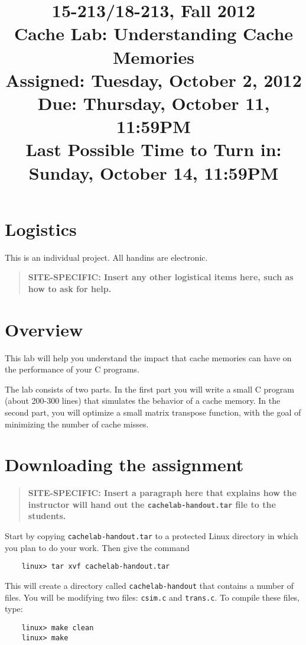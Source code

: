 \documentclass[11pt]{article}
\begin{document}
\title{15-213/18-213, Fall 2012\\
Cache Lab: Understanding Cache Memories\\
Assigned: Tuesday, October 2, 2012\\ 
Due: Thursday, October 11, 11:59PM\\
Last Possible Time to Turn in: Sunday, October 14, 11:59PM
}

\author{}
\date{}

\maketitle

\section{Logistics}
This is an individual project. All handins are electronic. 

\begin{quote}
{\bf SITE-SPECIFIC: Insert any other logistical items here, such as how to ask for help.}
\end{quote}


\section{Overview}
This lab will help you understand the impact that cache memories can
have on the performance of your C programs.

The lab consists of two parts. In the first part you will write a
small C program (about 200-300 lines) that simulates the behavior of a
cache memory.  In the second part, you will optimize a small matrix
transpose function, with the goal of minimizing the number of cache
misses.

\section{Downloading the assignment}

\begin{quote}
{\bf SITE-SPECIFIC: Insert a paragraph here that explains how the
instructor will hand out the {\tt cachelab-handout.tar} file to the
students.}
\end{quote}

Start by copying {\tt cachelab-handout.tar} to a protected Linux directory
in which you plan to do your work.  Then give the command
\begin{verbatim}
    linux> tar xvf cachelab-handout.tar
\end{verbatim}
This will create a directory called {\tt cachelab-handout} that
contains a number of files.  You will be modifying two
files: {\tt csim.c} and {\tt trans.c}.  To compile these files, type:
\begin{verbatim}
    linux> make clean
    linux> make
\end{verbatim}
\end{document}
